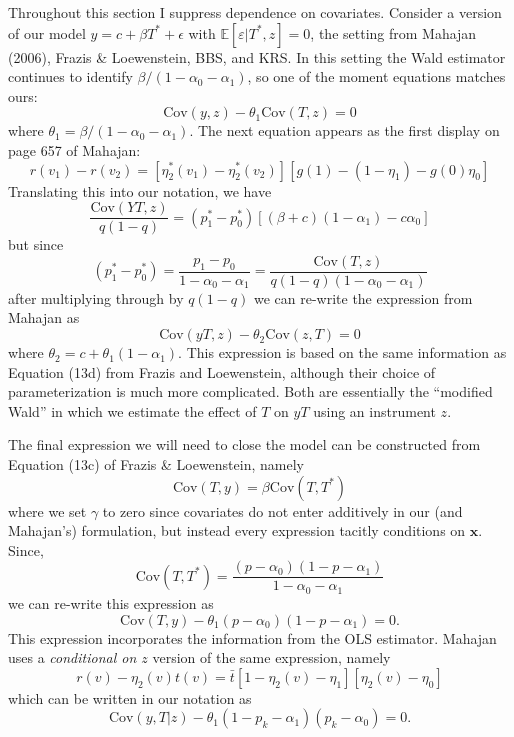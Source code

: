 \documentclass[12pt]{article}
\begin{document}
Throughout this section I suppress dependence on covariates.
Consider a version of our model $y = c + \beta T^* + \epsilon$ with $\mathbb{E}[\varepsilon|T^*,z] = 0$, the setting from Mahajan (2006), Frazis \& Loewenstein, BBS, and KRS.
In this setting the Wald estimator continues to identify $\beta / (1 - \alpha_0 - \alpha_1)$, so one of the moment equations matches ours:
\begin{equation}
  \mbox{Cov}(y,z) - \theta_1\mbox{Cov}(T,z) = 0
  \label{eq:WaldExog}
\end{equation}
where $\theta_1 = \beta / (1 - \alpha_0 - \alpha_1)$.
The next equation appears as the first display on page 657 of Mahajan:
\[
  r(v_1) - r(v_2) = \left[ \eta^*_2(v_1) - \eta^*_2(v_2) \right]\left[ g(1) - (1 - \eta_1) - g(0) \eta_0 \right]
\]
Translating this into our notation, we have
\[
  \frac{\mbox{Cov}(YT,z)}{q(1-q)} = (p_1^* - p_0^*) \left[ (\beta+c)(1 - \alpha_1) - c\alpha_0 \right]  
\]
but since 
\[
  (p_1^* - p_0^*) = \frac{p_1 - p_0}{1 - \alpha_0 - \alpha_1} = \frac{\mbox{Cov}(T,z)}{q (1 - q)(1 - \alpha_0 - \alpha_1)}
\]
after multiplying through by $q(1-q)$ we can re-write the expression from Mahajan as
\begin{equation}
  \mbox{Cov}(yT,z) - \theta_2 \mbox{Cov}(z,T) = 0 
  \label{eq:ModifiedWaldExog}
\end{equation}
where $\theta_2 = c + \theta_1 (1 -\alpha_1)$.
This expression is based on the same information as Equation (13d) from Frazis and Loewenstein, although their choice of parameterization is much more complicated.
Both are essentially the ``modified Wald'' in which we estimate the effect of $T$ on $yT$ using an instrument $z$.

The final expression we will need to close the model can be constructed from Equation (13c) of Frazis \& Loewenstein, namely 
\[
  \mbox{Cov}(T,y) = \beta \mbox{Cov}(T, T^*)
\]
where we set $\gamma$ to zero since covariates do not enter additively in our (and Mahajan's) formulation, but instead every expression tacitly conditions on $\mathbf{x}$.
Since,
\[
  \mbox{Cov}(T, T^*) = \frac{(p - \alpha_0)(1 - p - \alpha_1)}{1 - \alpha_0 - \alpha_1}
\]
we can re-write this expression as
\begin{equation}
  \mbox{Cov}(T,y) - \theta_1 (p - \alpha_0)(1 - p - \alpha_1) = 0.
  \label{eq:OLSExog}
\end{equation}
This expression incorporates the information from the OLS estimator.
Mahajan uses a \emph{conditional on $z$} version of the same expression, namely 
\[
  r(v) - \eta_2(v) t(v) = \bar{t} \left[ 1 - \eta_2(v) - \eta_1 \right]\left[ \eta_2(v) - \eta_0 \right]
\]
which can be written in our notation as
\[
  \mbox{Cov}(y,T|z) - \theta_1 (1 - p_k - \alpha_1)(p_k - \alpha_0) = 0.
\]
\end{document}
